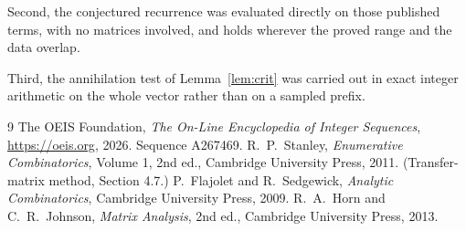 \documentclass[11pt,a4paper]{article}
\theoremstyle{plain}
\theoremstyle{definition}
\begin{document}
Second, the conjectured recurrence was evaluated directly on those published terms, with no
matrices involved, and holds wherever the proved range and the data overlap.

Third, the annihilation test of Lemma~\ref{lem:crit} was carried out in exact integer
arithmetic on the whole vector rather than on a sampled prefix.

\begin{thebibliography}{9}
 The OEIS Foundation, \emph{The On-Line Encyclopedia of Integer
Sequences}, \url{https://oeis.org}, 2026. Sequence A267469.
 R.~P.~Stanley, \emph{Enumerative Combinatorics}, Volume 1, 2nd ed.,
Cambridge University Press, 2011. (Transfer-matrix method, Section 4.7.)
 P.~Flajolet and R.~Sedgewick, \emph{Analytic Combinatorics}, Cambridge
University Press, 2009.
 R.~A.~Horn and C.~R.~Johnson, \emph{Matrix Analysis}, 2nd ed., Cambridge
University Press, 2013.
\end{thebibliography}
\end{document}
